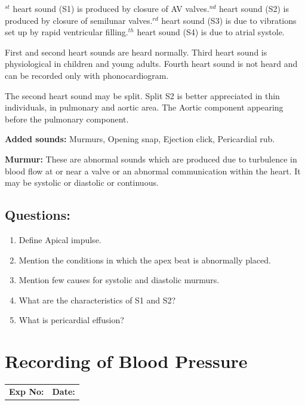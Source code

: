 \documentclass[a4paper,12pt,openany,oneside]{book}
\begin{document}
\par
{}$^{st}$ heart sound (S1) is produced by closure of AV valves.$^{nd}$ heart sound (S2) is produced by closure of semilunar valves.$^{rd}$ heart sound (S3) is due to vibrations set up by rapid ventricular filling.$^{th}$ heart sound (S4) is due to atrial systole.\newline
\par
First and second heart sounds are heard normally. Third heart sound is physiological in children and young adults. Fourth heart sound is not heard and can be recorded only with phonocardiogram.
\par
The second heart sound may be split. Split S2 is better appreciated in thin individuals, in pulmonary and aortic area. The Aortic component appearing before the pulmonary component.
\par
\textbf{Added sounds:} Murmurs, Opening snap, Ejection click, Pericardial rub.
\par
\textbf{Murmur:} These are abnormal sounds which are produced due to turbulence in blood flow at or near a valve or an abnormal communication within the heart. It may be systolic or diastolic or continuous.
	      \section*{Questions:}
	      \begin{enumerate}
\item{Define Apical impulse.}
\item{Mention the conditions in which the apex beat is abnormally placed.}
\item{Mention few causes for systolic and diastolic murmurs.}
\item{What are the characteristics of S1 and S2?}
\item{What is pericardial effusion?}
	      \end{enumerate}
															\chapter*{\centering Recording of Blood Pressure}
															\begin{tabular}{p{5in} p{1in}}
																\textbf{Exp No:}  & \textbf{Date:}\\
															\end{tabular}
\end{document}

